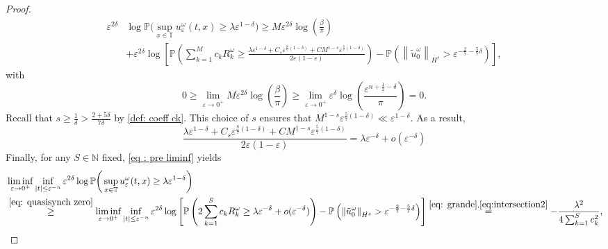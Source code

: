 \documentclass[a4paper,10pt,reqno]{article}
\theoremstyle{definition}
\theoremstyle{plain}
\theoremstyle{plain}
\theoremstyle{definition}
\theoremstyle{plain}
\theoremstyle{plain}
\theoremstyle{plain}
\theoremstyle{definition}
\theoremstyle{definition}
\newcommand{\norm}[1]{\left\lVert #1 \right\rVert}
\def \N{\mathbb N}
\def \P{{\mathbb P}}
\def \T{\mathbb{T}}
\begin{document}
\begin{proof}
\begin{equation}
\begin{split}
\varepsilon^{2\delta} & \log \P \bigg ( \sup_{x \in \T} u_{\varepsilon}^{\omega}(t,x) \ge \lambda \varepsilon^{1-\delta} \bigg ) \ge M \varepsilon^{2\delta} \log \left ( \frac{\beta}{\pi} \right ) \\
& + \varepsilon^{2\delta} \log \left[ \P \left( \sum_{k=1}^M c_k R_k^{\omega} \ge \frac{ \lambda \varepsilon^{1-\delta} + C_s \varepsilon^{\frac{8}{7}(1-\delta)} + C M^{1-s} \varepsilon^{\frac{5}{7}(1-\delta)} }{2 \varepsilon \left ( 1 - \varepsilon\right )} \right ) - \P \left ( \norm{\tilde{u}_0^{\omega}}_{\dot{H^s}} > \varepsilon^{-\frac{2}{7}-\frac{5}{7}\delta} \right ) \right],
\end{split}
\end{equation}
with
\begin{equation}\label{eq: quasisynch zero}
0\geq \lim_{\varepsilon\to 0^{+}} M \varepsilon^{2\delta} \log \left ( \frac{\beta}{\pi} \right ) \ge \lim_{\varepsilon\to 0^{+}} \varepsilon^{\delta} \log \left( \frac{\varepsilon^{n+\frac{1}{2}-\delta}}{\pi} \right) = 0.
\end{equation}
Recall that $s \geq \frac{1}{\delta}>\frac{2+5\delta}{7\delta}$ by \eqref{def: coeff ck}. This choice of $s$ ensures that $M^{1-s}\varepsilon^{\frac57 (1-\delta)} \ll \varepsilon^{1-\delta}$. As a result,
\[
\frac{ \lambda \varepsilon^{1-\delta} + C_s \varepsilon^{\frac{8}{7}(1-\delta)} + C M^{1-s} \varepsilon^{\frac{5}{7}(1-\delta)} }{2 \varepsilon \left ( 1 - \varepsilon\right )} = 
\lambda \varepsilon^{-\delta} + o(\varepsilon^{-\delta})
\]
Finally, for any $S \in \N$ fixed, \eqref{eq : pre liminf} yields
\[
\begin{split}
& \liminf_{\varepsilon \to 0^+} \inf_{|t|\leq \varepsilon^{-n}} \varepsilon^{2\delta} \log \P \bigg ( \sup_{x \in \T} u_{\varepsilon}^{\omega}(t,x) \ge \lambda \varepsilon^{1-\delta} \bigg )\\
& \stackrel{\eqref{eq: quasisynch zero}}{\ge}  \liminf_{\varepsilon \to 0^+} \inf_{|t|\leq \varepsilon^{-n}} \varepsilon^{2\delta} \log \left [ \P \left ( 2 \sum_{k=1}^S c_k R_k^{\omega} \ge \lambda \varepsilon^{-\delta} + o(\varepsilon^{-\delta}) \right ) - \P \left ( \norm{\tilde{u}_0^{\omega}}_{\dot{H^s}} > \varepsilon^{-\frac{2}{7}-\frac{5}{7}\delta} \right ) \right ]  \stackrel{\eqref{eq: grande},\eqref{eq:intersection2}}{=}  - \frac{\lambda^2}{4 \sum_{k=1}^S c_k^2},
\end{split}
\]

\end{proof}
\end{document}
